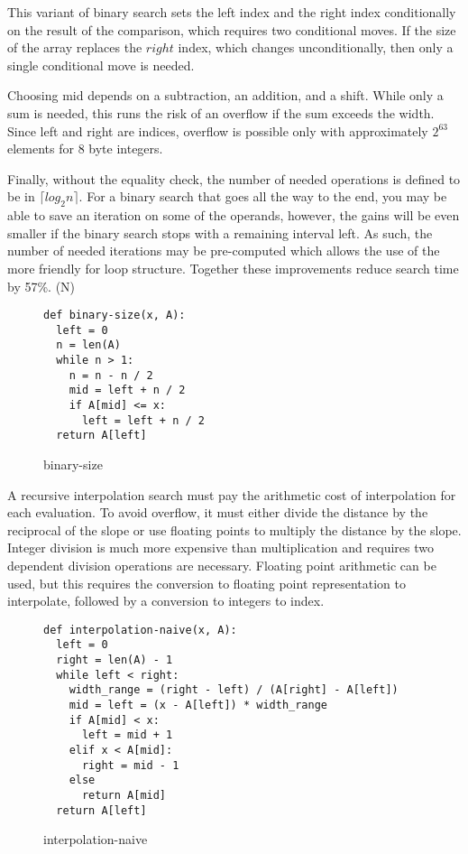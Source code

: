 \documentclass{article}
\begin{document}
This variant of binary search sets the left index and the right index conditionally on the result of the comparison, which requires two conditional moves. If the size of the array replaces the $right$ index, which changes unconditionally, then only a single conditional move is needed.

Choosing mid depends on a subtraction, an addition, and a shift. While only a sum is needed, this runs the risk of an overflow if the sum exceeds the width. Since left and right are indices, overflow is possible only with approximately $2^{63}$ elements for 8 byte integers.

Finally, without the equality check, the number of needed operations is defined to be in $\lceil log_2 n\rceil$. For a binary search that goes all the way to the end, you may be able to save an iteration on some of the operands, however, the gains will be even smaller if the binary search stops with a remaining interval left. As such, the number of needed iterations may be pre-computed which allows the use of the more friendly for loop structure. Together these improvements reduce search time by 57\%. (N)

\begin{figure}
\begin{verbatim}
def binary-size(x, A):
  left = 0
  n = len(A)
  while n > 1:
    n = n - n / 2
    mid = left + n / 2 
    if A[mid] <= x:
      left = left + n / 2
  return A[left]
\end{verbatim}
\caption{binary-size}
\end{figure}

A recursive interpolation search must pay the arithmetic cost of interpolation for each evaluation. To avoid overflow, it must either divide the distance by the reciprocal of the slope or use floating points to multiply the distance by the slope. Integer division is much more expensive than multiplication and requires two dependent division operations are necessary. Floating point arithmetic can be used, but this requires the conversion to floating point representation to interpolate, followed by a conversion to integers to index.

\begin{figure}
\begin{verbatim}
def interpolation-naive(x, A):
  left = 0
  right = len(A) - 1
  while left < right:
    width_range = (right - left) / (A[right] - A[left])
    mid = left = (x - A[left]) * width_range
    if A[mid] < x:
      left = mid + 1
    elif x < A[mid]:
      right = mid - 1
    else
      return A[mid]
  return A[left]
\end{verbatim}
\caption{interpolation-naive}
\end{figure}
\end{document}
